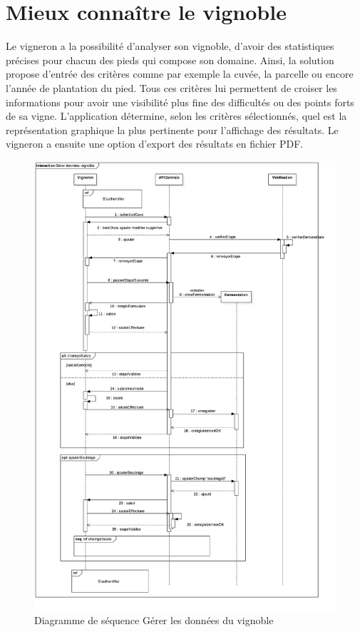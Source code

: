 \documentclass[a4paper, titlepage]{report}
\begin{document}
\section{Mieux connaître le vignoble}\label{mieux-connaitre-le-vignoble}

Le vigneron a la possibilité d'analyser son vignoble, d'avoir des
statistiques précises pour chacun des pieds qui compose son domaine.
Ainsi, la solution propose d'entrée des critères comme par exemple la
cuvée, la parcelle ou encore l'année de plantation du pied. Tous ces
critères lui permettent de croiser les informations pour avoir une
visibilité plus fine des difficultés ou des points forts de sa vigne.
L'application détermine, selon les critères sélectionnés, quel est la
représentation graphique la plus pertinente pour l'affichage des
résultats. Le vigneron a ensuite une option d'export des résultats en
fichier PDF.

\begin{figure}[!h]
\centering
\includegraphics{Images/SequenceDiagramGererDonneesVignoble}
\caption{Diagramme de séquence Gérer les données du vignoble}
\end{figure}
\end{document}
